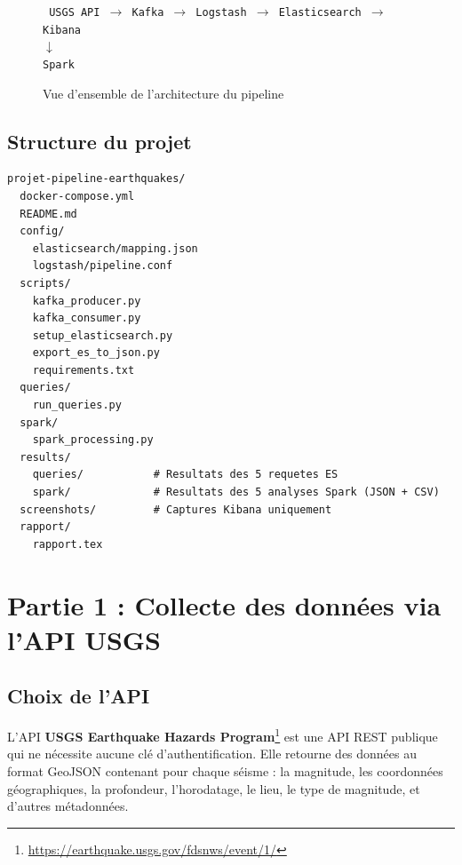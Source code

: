 \documentclass[12pt,a4paper]{article}
\begin{document}
\begin{figure}[H]
\centering
\begin{tcolorbox}[colback=white, colframe=black!50, width=\textwidth]
\centering
\texttt{%
USGS API $\longrightarrow$ Kafka $\longrightarrow$ Logstash $\longrightarrow$ Elasticsearch $\longrightarrow$ Kibana\\[0.2cm]
\hspace{6.5cm} $\downarrow$\\[0.1cm]
\hspace{6.5cm} Spark
}
\end{tcolorbox}
\caption{Vue d'ensemble de l'architecture du pipeline}
\end{figure}

\subsection{Structure du projet}

\begin{lstlisting}[caption={Arborescence du projet}]
projet-pipeline-earthquakes/
  docker-compose.yml
  README.md
  config/
    elasticsearch/mapping.json
    logstash/pipeline.conf
  scripts/
    kafka_producer.py
    kafka_consumer.py
    setup_elasticsearch.py
    export_es_to_json.py
    requirements.txt
  queries/
    run_queries.py
  spark/
    spark_processing.py
  results/
    queries/           # Resultats des 5 requetes ES
    spark/             # Resultats des 5 analyses Spark (JSON + CSV)
  screenshots/         # Captures Kibana uniquement
  rapport/
    rapport.tex
\end{lstlisting}

\section{Partie 1 : Collecte des données via l'API USGS}

\subsection{Choix de l'API}

L'API \textbf{USGS Earthquake Hazards Program}\footnote{\url{https://earthquake.usgs.gov/fdsnws/event/1/}} est une API REST publique qui ne nécessite aucune clé d'authentification. Elle retourne des données au format GeoJSON contenant pour chaque séisme : la magnitude, les coordonnées géographiques, la profondeur, l'horodatage, le lieu, le type de magnitude, et d'autres métadonnées.
\end{document}
